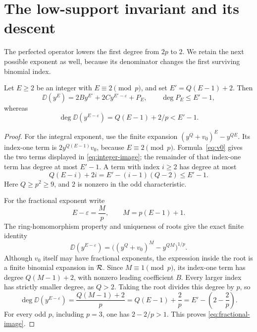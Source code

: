 \section{The low-support invariant and its descent}\label{sec:low}

The perfected operator lowers the first degree from $2p$ to $2$.
We retain the next possible exponent as well, because its denominator
changes the first surviving binomial index.

\begin{lemma}\label{lem:fractional}
Let $E\ge2$ be an integer with $E\equiv2\pmod p$, and set
$E'=Q(E-1)+2$. Then
\begin{equation}\label{eq:integer-image}
 \DD(y^E)=2B y^{E'}+2C y^{E'-\varepsilon}+P_E,
 \qquad \deg P_E\le E'-1,
\end{equation}
whereas
\begin{equation}\label{eq:fractional-image}
 \deg\DD(y^{E-\varepsilon})
 =Q(E-1)+2/p<E'-1.
\end{equation}
\end{lemma}

\begin{proof}
For the integral exponent, use the finite expansion
$(y^Q+v_0)^E-y^{QE}$. Its index-one term is
$2y^{Q(E-1)}v_0$, because $E\equiv2\pmod p$.
Formula~\eqref{eq:v0} gives the two terms displayed in
\eqref{eq:integer-image}; the remainder of that index-one term
has degree at most $E'-1$. A term with index $i\ge2$ has degree
at most
\[
 Q(E-i)+2i=E'-(i-1)(Q-2)\le E'-1.
\]
Here $Q\ge p^2\ge9$, and $2$ is nonzero in the odd characteristic.

For the fractional exponent write
\[
 E-\varepsilon=\frac{M}{p},\qquad M=p(E-1)+1.
\]
The ring-homomorphism property and uniqueness of roots give the
exact finite identity
\begin{equation}\label{eq:fractional-finite}
 \DD(y^{E-\varepsilon})
 =\bigl((y^Q+v_0)^M-y^{QM}\bigr)^{1/p}.
\end{equation}
Although $v_0$ itself may have fractional exponents, the expression
inside the root is a finite binomial expansion in $\mathcal R$.
Since $M\equiv1\pmod p$, its index-one term has degree
$Q(M-1)+2$, with nonzero leading coefficient $B$.
Every larger index has strictly smaller degree, as $Q>2$.
Taking the root divides this degree by $p$, so
\[
 \deg\DD(y^{E-\varepsilon})
 =\frac{Q(M-1)+2}{p}
 =Q(E-1)+\frac2p
 =E'-\left(2-\frac2p\right).
\]
For every odd $p$, including $p=3$, one has $2-2/p>1$.
This proves \eqref{eq:fractional-image}.
\end{proof}


